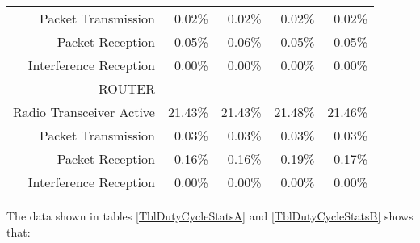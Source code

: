 \documentclass[a4paper,twoside]{article}
\begin{document}
\begin{subtables}
\begin{table*}[htbp]
\begin{tabular}{|r|r|r|r|r|}
Packet Transmission & 0.02\% & 0.02\% & 0.02\% & 0.02\% \\
Packet Reception & 0.05\% & 0.06\% & 0.05\% & 0.05\% \\
Interference Reception & 0.00\% & 0.00\% & 0.00\% & 0.00\% \\
ROUTER & & & & \\
Radio Transceiver Active & 21.43\% & 21.43\% & 21.48\% & 21.46\% \\
Packet Transmission & 0.03\% & 0.03\% & 0.03\% & 0.03\% \\
Packet Reception & 0.16\% & 0.16\% & 0.19\% & 0.17\% \\
Interference Reception & 0.00\% & 0.00\% & 0.00\% & 0.00\% \\
\hline
\end{tabular}
\caption{Duty cycle statistics, according to the ContikiMAC channel
         check rate (64 to 256 Hz).\\
         Results obtained with fixed 10-minute duration simulations.}
\label{TblDutyCycleStatsB}
\end{table*}
\end{subtables}

The data shown in tables \ref{TblDutyCycleStatsA} and \ref{TblDutyCycleStatsB}
shows that:
\end{document}
